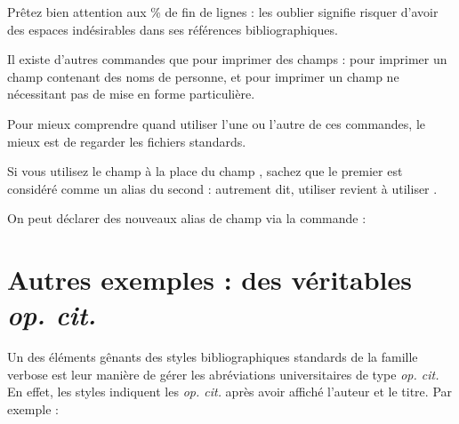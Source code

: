 \begin{latexcode}
\end{latexcode}





Prêtez bien attention aux \% de fin de lignes : les oublier signifie risquer d'avoir des espaces indésirables dans ses références bibliographiques.


\begin{plusloins}

Il  existe d'autres commandes que  pour imprimer des champs :  pour imprimer un champ contenant des noms de personne, et  pour imprimer un champ ne nécessitant pas de mise en forme particulière.

Pour mieux comprendre quand utiliser l'une ou l'autre de ces commandes, le mieux est de regarder les fichiers standards.

\end{plusloins}
\begin{plusloins}
Si vous utilisez le champ  à la place du champ , sachez que le premier est considéré comme un alias du second : autrement dit, utiliser  revient à utiliser .

On peut déclarer des nouveaux alias de champ via la commande :

\end{plusloins}

\section{Autres exemples : des véritables \emph{op. cit.}}

Un des éléments gênants des styles bibliographiques standards de la famille verbose est leur manière de gérer les abréviations universitaires de type \emph{op. cit.} En effet, les styles indiquent les \emph{op. cit.} après avoir affiché l'auteur et le titre. Par exemple :

\begin{quotation}
\bibverbose	
\cite{Urner1952}

\cite{Saxer1980}
\bibverbosetrad

\cite{Urner1952}

\cite{Saxer1980}
\end{quotation}

